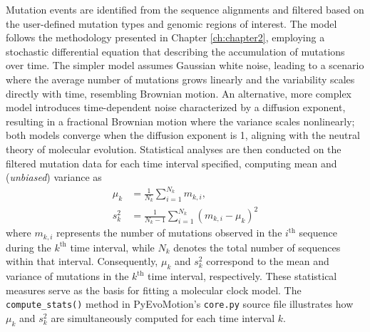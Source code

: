 Mutation events are identified from the sequence alignments and filtered based on the user-defined mutation types and genomic regions of interest. The model follows the methodology presented in Chapter \ref{ch:chapter2}, employing a stochastic differential equation that describing the accumulation of mutations over time. The simpler model assumes Gaussian white noise, leading to a scenario where the average number of mutations grows linearly and the variability scales directly with time, resembling Brownian motion. An alternative, more complex model introduces time-dependent noise characterized by a diffusion exponent, resulting in a fractional Brownian motion where the variance scales nonlinearly; both models converge when the diffusion exponent is 1, aligning with the neutral theory of molecular evolution. Statistical analyses are then conducted on the filtered mutation data for each time interval specified, computing mean and (\textit{unbiased}) variance as
%
\begin{align}
    \mu_k &= \frac{1}{N_k}\sum_{i=1}^{N_k}m_{k,i},\\
    s_k^2 &= \frac{1}{N_k-1}\sum_{i=1}^{N_k}\left(m_{k,i} - \mu_k\right)^2
\end{align}
%
where $m_{k,i}$ represents the number of mutations observed in the $i^\text{th}$ sequence during the $k^\text{th}$ time interval, while $N_k$ denotes the total number of sequences within that interval. Consequently, $\mu_k$ and $s_k^2$ correspond to the mean and variance of mutations in the $k^\text{th}$ time interval, respectively. These statistical measures serve as the basis for fitting a molecular clock model. The \texttt{compute\_stats()} method in PyEvoMotion's \texttt{core.py} source file illustrates how $\mu_k$ and $s_k^2$ are simultaneously computed for each time interval $k$.

